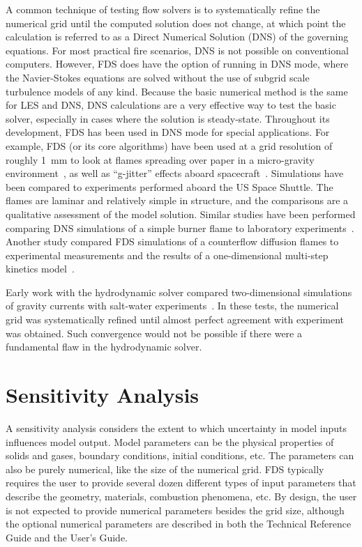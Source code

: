 \documentclass[11pt]{book}
\begin{document}
A common technique of testing flow solvers is to systematically refine the numerical grid until the computed solution does not change, at which point
the calculation is referred to as a Direct Numerical Solution (DNS) of the governing equations.  For most practical fire scenarios, DNS is not
possible on conventional computers. However, FDS does have the option of running in DNS mode, where the Navier-Stokes equations are solved without
the use of subgrid scale turbulence models of any kind. Because the basic numerical method is the same for LES and DNS, DNS calculations are a very
effective way to test the basic solver, especially in cases where the solution is steady-state. Throughout its development, FDS has been used in DNS
mode for special applications.  For example, FDS (or its core algorithms) have been used at a grid resolution of roughly 1~mm to look at flames
spreading over paper in a micro-gravity environment~\cite{McGrattan:CF1996,Kashiwagi:CS1996,Mell:CS98,Mell:CS00,Prasad:CS2002,Nakamura:CF2002}, as
well as ``g-jitter'' effects aboard spacecraft~\cite{Mell:g-jitter}. Simulations have been compared to experiments performed aboard the US Space
Shuttle.  The flames are laminar and relatively simple in structure, and the comparisons are a qualitative assessment of the model solution. Similar
studies have been performed comparing DNS simulations of a simple burner flame to laboratory experiments~\cite{Mukhopadhyay:1}. Another study
compared FDS simulations of a counterflow diffusion flames to experimental measurements and the results of a one-dimensional multi-step kinetics
model~\cite{Hamins:NASA}.

Early work with the hydrodynamic solver compared two-dimensional simulations of gravity currents with salt-water experiments~\cite{McGrattan:1}. In
these tests, the numerical grid was systematically refined until almost perfect agreement with experiment was obtained. Such convergence would not be
possible if there were a fundamental flaw in the hydrodynamic solver.




\section{Sensitivity Analysis}

A sensitivity  analysis considers the  extent to which  uncertainty in model  inputs influences  model output.  Model parameters  can  be the
physical properties of solids  and gases, boundary conditions, initial conditions, etc. The parameters  can also be  purely numerical, like
the size  of the numerical grid. FDS  typically requires the user to  provide several  dozen different  types of  input  parameters that describe the
geometry, materials,  combustion phenomena, etc. By design,  the user  is  not expected  to  provide numerical  parameters besides the grid
size,  although the optional numerical parameters are described in both the Technical Reference Guide and the User's Guide.
\end{document}
